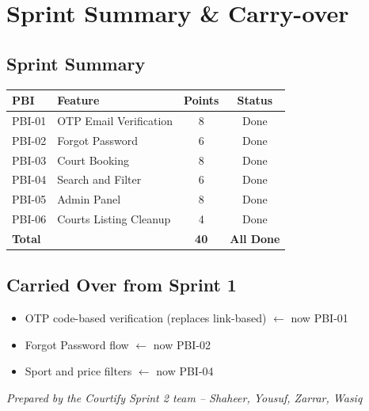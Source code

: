 \documentclass[12pt,a4paper]{article}
\begin{document}
\vspace{2em}

\section{Sprint Summary \& Carry-over}

\subsection*{Sprint Summary}
\renewcommand{\arraystretch}{1.4}
\begin{tabularx}{\textwidth}{|l|X|c|c|}
\hline
\rowcolor{headerbg}\color{white}\bfseries PBI & \color{white}\bfseries Feature & \color{white}\bfseries Points & \color{white}\bfseries Status \\ \hline
PBI-01 & OTP Email Verification & 8 & Done \\ \hline
\rowcolor{rowgray} PBI-02 & Forgot Password & 6 & Done \\ \hline
PBI-03 & Court Booking & 8 & Done \\ \hline
\rowcolor{rowgray} PBI-04 & Search and Filter & 6 & Done \\ \hline
PBI-05 & Admin Panel & 8 & Done \\ \hline
\rowcolor{rowgray} PBI-06 & Courts Listing Cleanup & 4 & Done \\ \hline
\rowcolor{headerbg}\color{white}\bfseries Total & & \color{white}\bfseries 40 & \color{white}\bfseries All Done \\ \hline
\end{tabularx}

\vspace{1.5em}

\subsection*{Carried Over from Sprint 1}
\begin{itemize}
    \item OTP code-based verification (replaces link-based) $\leftarrow$ now PBI-01
    \item Forgot Password flow $\leftarrow$ now PBI-02
    \item Sport and price filters $\leftarrow$ now PBI-04
\end{itemize}

\vspace{2cm}
\begin{center}
\textit{Prepared by the Courtify Sprint 2 team -- Shaheer, Yousuf, Zarrar, Wasiq}
\end{center}
\end{document}
